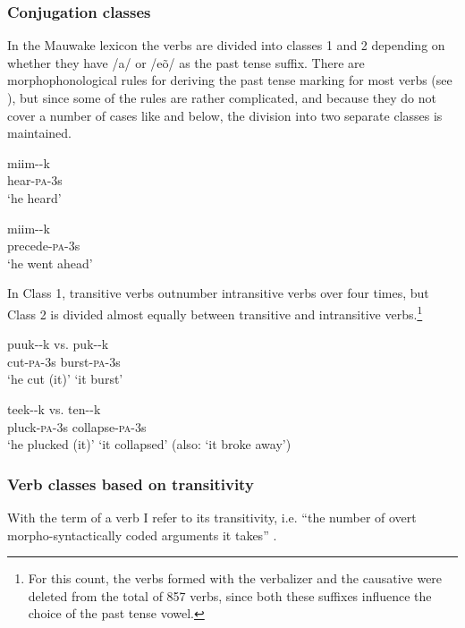 \subsubsection{Conjugation classes}\label{sec:3:z:y:x}
{}
In the Mauwake lexicon the verbs are divided into classes 1 and 2 depending on whether they have /a/ or /e\~{o}/ as the past tense suffix. There are morphophonological rules for deriving the past tense marking for most verbs (see ), but since some of the rules are rather complicated, and because they do not cover a number of cases like  and  below, the division into two separate classes is maintained.

\ea%
\label{ex:3:x253}
\gll miim--k \\
hear-\textsc{pa}-3s \\
\glt`he heard'
\z

\ea%
\label{ex:3:x254}
\gll miim--k \\
precede-\textsc{pa}-3s \\
\glt`he went ahead'
\z

In Class 1, transitive verbs outnumber intransitive verbs over four times, but Class 2 is divided almost equally between transitive and intransitive verbs.\footnote{For this count, the verbs formed with the verbalizer  and the causative  were deleted from the total of 857 verbs, since both these suffixes influence the choice of the past tense vowel.}

\ea%
\label{ex:3:x255}
\gll puuk--k vs. puk--k \\
cut-\textsc{pa}-3s burst-\textsc{pa}-3s \\
\glt`he cut (it)' `it burst' 
\z

\ea%
\label{ex:3:x256}
\gll teek--k vs. ten--k \\
pluck-\textsc{pa}-3s collapse-\textsc{pa}-3s\\
\glt`he plucked (it)' `it collapsed' (also: `it broke away')
\z

\subsubsection{Verb classes based on transitivity}\label{sec:3:z:y:x}
{}
With the term  of a verb I refer to its  transitivity, i.e. ``{the number of overt morpho-syntactically coded arguments it takes}'' \citep[147]{VanValinEtAl1997}. 

